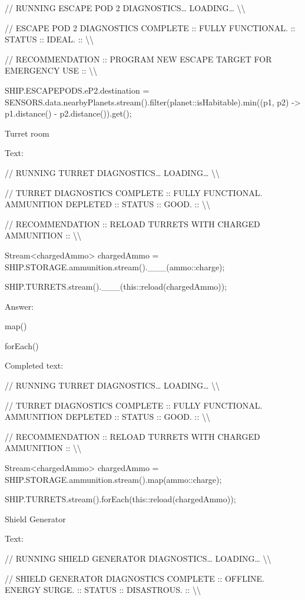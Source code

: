 \documentclass[
]{article}
\begin{document}
// RUNNING ESCAPE POD 2 DIAGNOSTICS\ldots{} LOADING\ldots{}
\textbackslash\textbackslash{}

// ESCAPE POD 2 DIAGNOSTICS COMPLETE :: FULLY FUNCTIONAL. :: STATUS ::
IDEAL. :: \textbackslash\textbackslash{}

// RECOMMENDATION :: PROGRAM NEW ESCAPE TARGET FOR EMERGENCY USE ::
\textbackslash\textbackslash{}

SHIP.ESCAPEPODS.eP2.destination =
SENSORS.data.nearbyPlanets.stream().filter(planet::isHabitable).min((p1,
p2) -\textgreater{} p1.distance() - p2.distance()).get();

Turret room

Text:

// RUNNING TURRET DIAGNOSTICS\ldots{} LOADING\ldots{}
\textbackslash\textbackslash{}

// TURRET DIAGNOSTICS COMPLETE :: FULLY FUNCTIONAL. AMMUNITION DEPLETED
:: STATUS :: GOOD. :: \textbackslash\textbackslash{}

// RECOMMENDATION :: RELOAD TURRETS WITH CHARGED AMMUNITION ::
\textbackslash\textbackslash{}

Stream\textless chargedAmmo\textgreater{} chargedAmmo =
SHIP.STORAGE.ammunition.stream().\_\_\_(ammo::charge);

SHIP.TURRETS.stream().\_\_\_(this::reload(chargedAmmo));

Answer:

map()

forEach()

Completed text:

// RUNNING TURRET DIAGNOSTICS\ldots{} LOADING\ldots{}
\textbackslash\textbackslash{}

// TURRET DIAGNOSTICS COMPLETE :: FULLY FUNCTIONAL. AMMUNITION DEPLETED
:: STATUS :: GOOD. :: \textbackslash\textbackslash{}

// RECOMMENDATION :: RELOAD TURRETS WITH CHARGED AMMUNITION ::
\textbackslash\textbackslash{}

Stream\textless chargedAmmo\textgreater{} chargedAmmo =
SHIP.STORAGE.ammunition.stream().map(ammo::charge);

SHIP.TURRETS.stream().forEach(this::reload(chargedAmmo));

Shield Generator

Text:

// RUNNING SHIELD GENERATOR DIAGNOSTICS\ldots{} LOADING\ldots{}
\textbackslash\textbackslash{}

// SHIELD GENERATOR DIAGNOSTICS COMPLETE :: OFFLINE. ENERGY SURGE. ::
STATUS :: DISASTROUS. :: \textbackslash\textbackslash{}
\end{document}
